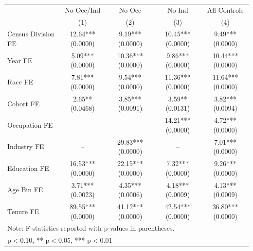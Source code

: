 \begin{tabular}{lcccc}
\hline\hline
 & No Occ/Ind & No Occ & No Ind & All Controls \\
 & (1) & (2) & (3) & (4) \\
\hline
Census Division FE&12.64*** (0.0000)&9.19*** (0.0000)&10.45*** (0.0000)&9.49*** (0.0000)\\
Year FE&5.09*** (0.0000)&10.36*** (0.0000)&9.86*** (0.0000)&10.44*** (0.0000)\\
Race FE&7.81*** (0.0000)&9.54*** (0.0000)&11.36*** (0.0000)&11.64*** (0.0000)\\
Cohort FE&2.65** (0.0468)&3.85*** (0.0091)&3.59** (0.0131)&3.82*** (0.0094)\\
Occupation FE&--&--&14.21*** (0.0000)&4.72*** (0.0000)\\
Industry FE&--&29.83*** (0.0000)&--&7.01*** (0.0000)\\
Education FE&16.53*** (0.0000)&22.15*** (0.0000)&7.32*** (0.0000)&9.26*** (0.0000)\\
Age Bin FE&3.71*** (0.0023)&4.35*** (0.0006)&4.18*** (0.0009)&4.13*** (0.0009)\\
Tenure FE&89.55*** (0.0000)&41.12*** (0.0000)&42.54*** (0.0000)&36.80*** (0.0000)\\
\hline
\multicolumn{5}{l}{\footnotesize Note: F-statistics reported with p-values in parentheses.} \\
\multicolumn{5}{l}{\footnotesize * p$<$0.10, ** p$<$0.05, *** p$<$0.01} \\
\hline\hline
\end{tabular}
